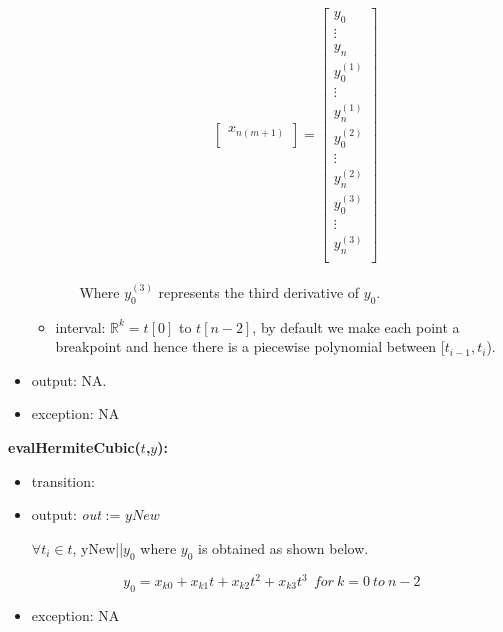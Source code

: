 \documentclass[12pt, titlepage]{article}
\begin{document}
\begin{itemize}
\begin{itemize}
\begin{enumerate}
\begin{equation*}
\begin{bmatrix}
		x_{n(m+1)} \\
		\end{bmatrix} = 
		\begin{bmatrix}
		y_0  \\
		\vdots \\
		y_n  \\
		y_0 ^{(1)} \\
		\vdots \\
		y_n ^{(1)} \\
		y_0 ^{(2)} \\
		\vdots \\
		y_n ^{(2)} \\  
		y_0 ^{(3)} \\
		\vdots \\
		y_n ^{(3)} \\ 
		\end{bmatrix}
		\end{equation*}\\ 
		Where $y_0 ^{(3)}$ represents the third derivative of $y_0$.
		\end{enumerate}
		\item interval: $\mathbb{R}^{k} = t[0] $ to $t[n-2]$, by default we 
		make each point a breakpoint and hence there is a piecewise polynomial 
		between [$t_{i-1},t_i$).
	\end{itemize}	
	
	\item output: NA.	
	
\item exception: NA 
\end{itemize}



\noindent \textbf{evalHermiteCubic($t$,$y$):}
\begin{itemize}
	\item transition: 
		
	\item output:  \textit{out} := $yNew$
	
	$\forall t_i \in t$, yNew||$y_0$ where $y_0$ is obtained as shown 
	below.
	
	\begin{equation*}
	y_0 = x_{k0} + x_{k1} t + x_{k2} t^{2} + x_{k3} t^{3}\ \ for\ k = 0\ to\ n-2
	\end{equation*}
	
	\item exception: NA
\end{itemize}



\end{document}
